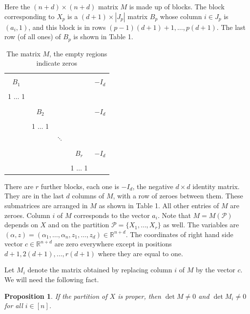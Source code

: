 \documentclass[12pt,a4paper]{amsart}
\newtheorem{prop}{Proposition}[section]
\newcommand{\al}{\alpha}
\newcommand{\R}{\mathbb{R}}
\newcommand{\p}{\mathcal{P}}
\numberwithin{equation}{section}
\begin{document}
Here the $(n+d)\times(n+d)$ matrix $M$ is made up of blocks. The block corresponding to $X_p$ is a $(d+1)\times |J_p|$ matrix $B_p$ whose column $i \in J_p$ is $(a_i,1)$, and this block is in rows $(p-1)(d+1)+1,\ldots,p(d+1)$. The last row (of all ones) of $B_p$ is shown in Table 1.
\begin{table}[h]\label{fig:1}
\begin{center}
\begin{tabular}{|c|c|c|c|c|}
  \hline
   & & & & \\
   $B_1$ & & & & \hspace*{.1in} $-I_d$
                           \hspace*{.1in}  \\
   & & & & \\
   \hline
     1 $\dots$ 1 & & & & \\
  \hline
   & & & & \\
  &  $B_2$ & & & $-I_d$ \\
   & & & & \\
   \hline
    &  1 $\dots$ 1 & & & \\
  \hline
  & & $\ddots$ & & \\
  \hline
   & & & & \\
   & & & $B_r$ & $-I_d$ \\
   & & & & \\
  \hline
     & & &  1 $\dots$ 1  & \\
     \hline
\end{tabular}
\bigskip
\end{center}
\caption{The matrix $M$, the empty regions indicate zeros}
\end{table}
There are $r$ further blocks, each one is $-I_d$, the negative $d \times d$ identity matrix. They are in the last $d$ columns of $M$, with a row of zeroes between them. These submatrices are arranged in $M$ as shown in Table 1. All other entries of $M$ are zeroes. Column $i$ of $M$ corresponds to the vector $a_i$. Note that $M=M(\p)$ depends on $X$ and on the partition $\p=\{X_1,\ldots,X_r\}$ as well. The variables are $(\al,z) =(\al_1,\ldots,\al_n,z_1,\ldots,z_d) \in \R^{n+d}.$ The coordinates of right hand side vector $c\in \R^{n+d}$ are zero everywhere except in positions $d+1,2(d+1),\ldots,r(d+1)$ where they are equal to one.


Let $M_i$ denote the matrix obtained by replacing column $i$ of $M$ by the vector $c$. We will need the following fact.

\begin{prop}\label{base} If the partition of $X$ is proper, then $\det M\ne 0$ and $\det M_i \ne 0$ for all $i \in [n]$.
\end{prop}
\end{document}
